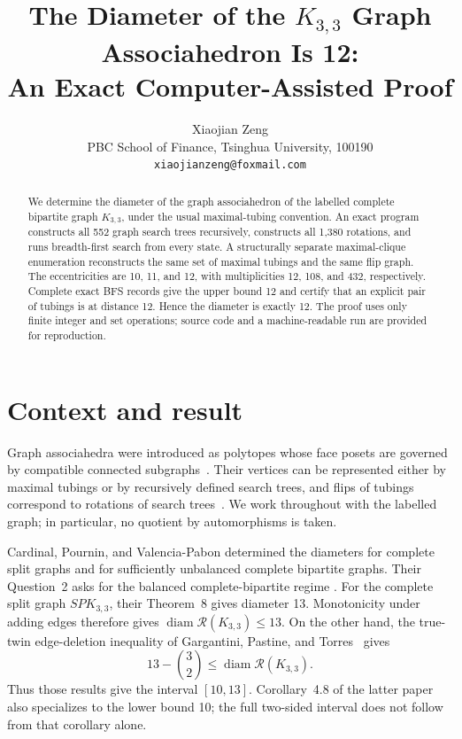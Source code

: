 \documentclass[11pt]{article}
\title{The Diameter of the \(K_{3,3}\) Graph Associahedron Is 12:\\
An Exact Computer-Assisted Proof}
\author{Xiaojian Zeng\\
PBC School of Finance, Tsinghua University, 100190\\
\texttt{xiaojianzeng@foxmail.com}}
\date{}
\newcommand{\Rcal}{\mathcal{R}}
\begin{document}
\maketitle

\begin{abstract}
We determine the diameter of the graph associahedron of the labelled complete
bipartite graph \(K_{3,3}\), under the usual maximal-tubing convention.  An
exact program constructs all 552 graph search trees recursively, constructs
all 1,380 rotations, and runs breadth-first search from every state.  A
structurally separate maximal-clique enumeration reconstructs the same set of
maximal tubings and the same flip graph.  The eccentricities are 10, 11, and
12, with multiplicities 12, 108, and 432, respectively.  Complete exact BFS
records give the upper bound 12 and certify that an explicit pair of tubings
is at distance 12.  Hence the diameter is exactly 12.  The proof uses only
finite integer and set operations; source code and a machine-readable run are
provided for reproduction.
\end{abstract}

\section{Context and result}

Graph associahedra were introduced as polytopes whose face posets are governed
by compatible connected subgraphs~\cite{CarrDevadoss2006}.  Their vertices can
be represented either by maximal tubings or by recursively defined search
trees, and flips of tubings correspond to rotations of search
trees~\cite{CardinalPourninValenciaPabon2022}.  We work throughout with the
labelled graph; in particular, no quotient by automorphisms is taken.

Cardinal, Pournin, and Valencia-Pabon determined the diameters for complete
split graphs and for sufficiently unbalanced complete bipartite graphs.  Their
Question~2 asks for the balanced complete-bipartite regime
\cite{CardinalPourninValenciaPabon2022}.  For the complete split graph
\(SPK_{3,3}\), their Theorem~8 gives diameter 13.  Monotonicity under adding
edges therefore gives
\(\operatorname{diam}\Rcal(K_{3,3})\leq 13\).  On the other hand, the
true-twin edge-deletion inequality of Gargantini, Pastine, and
Torres~\cite[Theorem~4.7]{GargantiniPastineTorres2024} gives
\[
  13-\binom{3}{2}\leq \operatorname{diam}\Rcal(K_{3,3}).
\]
Thus those results give the interval \([10,13]\).  Corollary~4.8 of the latter
paper also specializes to the lower bound 10; the full two-sided interval does
not follow from that corollary alone.
\end{document}
